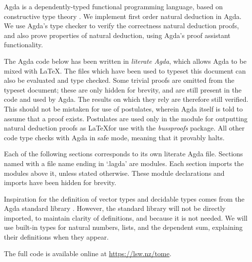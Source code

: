 Agda \citep{agdawiki} is a dependently-typed functional programming language,
based on constructive type theory \citep{norellthesis}. We implement first order
natural deduction in Agda. We use Agda's type checker to verify the correctness
natural deduction proofs, and also prove properties of natural deduction, using
Agda's proof assistant functionality.

The Agda code below has been written in \emph{literate Agda}, which allows Agda
to be mixed with \LaTeX. The files which have been used to typeset this document
can also be evaluated and type checked. Some trivial proofs are omitted from the
typeset document; these are only hidden for brevity, and are still present in
the code and used by Agda. The results on which they rely are therefore still
verified. This should not be mistaken for use of postulates, wherein Agda itself
is told to assume that a proof exists. Postulates are used only in the module
for outputting natural deduction proofs as \LaTeX for use with the
\emph{bussproofs} package. All other code type checks with Agda in safe mode,
meaning that it provably halts.

Each of the following sections corresponds to its own literate Agda file.
Sections named with a file name ending in `.lagda' are modules. Each section
imports the modules above it, unless stated otherwise. These module declarations
and imports have been hidden for brevity.

Inspiration for the definition of vector types and decidable types comes from
the Agda standard library \citep{agdastdlib}. However, the standard library will
not be directly imported, to maintain clarity of definitions, and because it is
not needed. We will use built-in types for natural numbers, lists, and the
dependent sum, explaining their definitions when they appear.

The full code is available online at \url{https://lsw.nz/tome}. 
